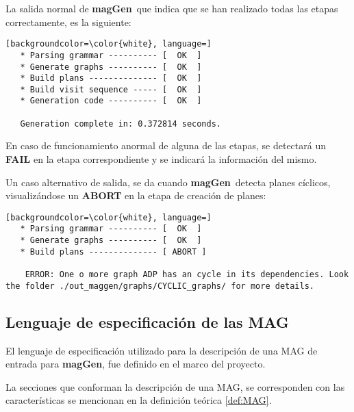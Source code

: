 \documentclass[runningheads,a4paper]{llncs}
\newcommand{\maggen}{\textbf{magGen}}
\begin{document}
La salida normal de \maggen\ que indica que se han realizado todas las etapas correctamente, es la siguiente:
{\scriptsize
\vspace{0.3cm}
\begin{lstlisting}[backgroundcolor=\color{white}, language=]
   * Parsing grammar ---------- [  OK  ]
   * Generate graphs ---------- [  OK  ]
   * Build plans -------------- [  OK  ]
   * Build visit sequence ----- [  OK  ]
   * Generation code ---------- [  OK  ]

   Generation complete in: 0.372814 seconds.
\end{lstlisting}
\vspace{0.3cm}}

En caso de funcionamiento anormal de alguna de las etapas, se detectará un \textbf{FAIL} en la etapa correspondiente y se indicará la información del mismo.

Un caso alternativo de salida, se da cuando \maggen\ detecta planes cíclicos, visualizándose un \textbf{ABORT} en la etapa de creación de planes:
{\scriptsize
\vspace{0.3cm}
\begin{lstlisting}[backgroundcolor=\color{white}, language=] 
   * Parsing grammar ---------- [  OK  ]
   * Generate graphs ---------- [  OK  ]
   * Build plans -------------- [ ABORT ]

    ERROR: One o more graph ADP has an cycle in its dependencies. Look the folder ./out_maggen/graphs/CYCLIC_graphs/ for more details.
\end{lstlisting}
\vspace{0.3cm}}

\subsection{Lenguaje de especificación de las MAG}
\label{sec:lenguajeMAG}

El lenguaje de especificación utilizado para la descripción de una MAG de entrada para \maggen, fue definido en el marco del proyecto.
 
La secciones que conforman la descripción de una MAG, se corresponden con las características se mencionan en la definición teórica \ref{def:MAG}.
 
\end{document}
